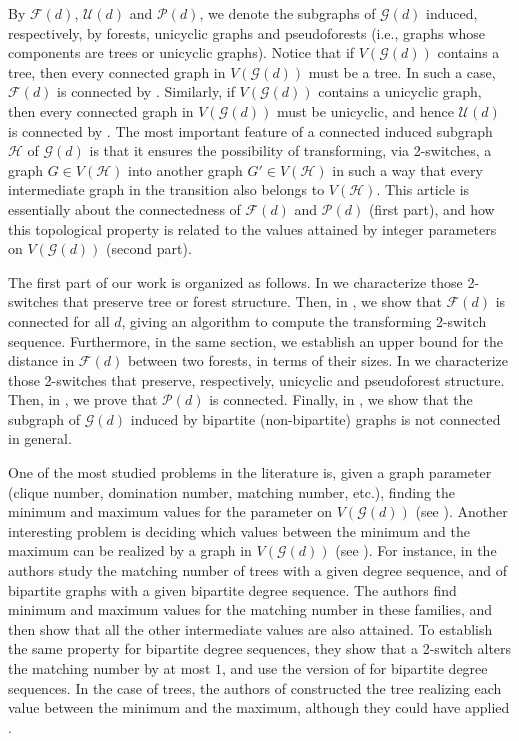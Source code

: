 \documentclass{BICA}
\begin{document}
By $\mathcal{F}(d)$, $\mathcal{U}(d)$ and $\mathcal{P}(d)$, we denote the subgraphs of $\mathcal{G}(d)$ induced, respectively, by forests, unicyclic graphs and pseudoforests (i.e., graphs whose components are trees or unicyclic graphs). Notice that if $V(\mathcal{G}(d))$ contains a tree, then every connected graph in $V(\mathcal{G}(d))$ must be a tree. In such a case, $\mathcal{F}(d)$ is connected by . Similarly, if $V(\mathcal{G}(d))$ contains a unicyclic graph, then every connected graph in $V(\mathcal{G}(d))$ must be unicyclic, and hence $\mathcal{U}(d)$ is connected by . The most important feature of a connected induced subgraph $\mathcal{H}$ of $\mathcal{G}(d)$ is that it ensures the possibility of transforming, via 2-switches, a graph $G\in V(\mathcal{H})$ into another graph $G'\in V(\mathcal{H})$ in such a way that every intermediate graph in the transition also belongs to $V(\mathcal{H})$. This article is essentially about the connectedness of $\mathcal{F}(d)$ and $\mathcal{P}(d)$ (first part), and how this topological property is related to the values attained by integer parameters on $V(\mathcal{G}(d))$ (second part).

The first part of our work is organized as follows. In  we characterize those 2-switches that preserve tree or forest structure. Then, in , we show that $\mathcal{F}(d)$ is connected for all $d$, giving an algorithm to compute the transforming 2-switch sequence. Furthermore, in the same section, we establish an upper bound for the distance in $\mathcal{F}(d)$ between two forests, in terms of their sizes. In  we characterize those 2-switches that preserve, respectively, unicyclic and pseudoforest structure. Then, in , we prove that $\mathcal{P}(d)$ is connected. Finally, in , we show that the subgraph of $\mathcal{G}(d)$ induced by bipartite (non-bipartite) graphs is not connected in general.

One of the most studied problems in the literature is, given a graph parameter (clique number, domination number, matching number, etc.), finding the minimum and maximum values for the parameter on $V(\mathcal{G}(d))$ (see \cite{BockRat,GHR1,GHR2,wang2008extremal,zhang2008laplacian,zhang2013number}). Another interesting problem is deciding which values between the minimum and the maximum can be realized by a graph in $V(\mathcal{G}(d))$ (see \cite{kurnosov2020set,Rao}). For instance, in \cite{BockRat} the authors study the matching number of trees with a given degree sequence, and of bipartite graphs with a given bipartite degree sequence. The authors find minimum and maximum values for the matching number in these families, and then show that all the other intermediate values are also attained. To establish the same property for bipartite degree sequences, they show that a 2-switch alters the matching number by at most $1$, and use the version of  for bipartite degree sequences. In the case of trees, the authors of \cite{BockRat} constructed the tree realizing each value between the minimum and the maximum, although they could have applied .
\end{document}
